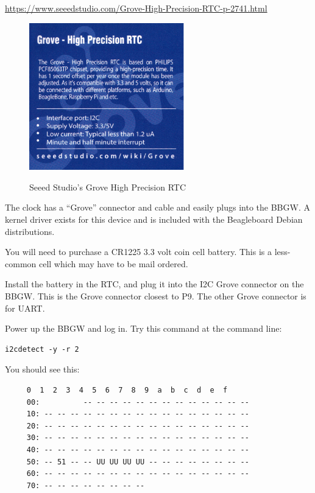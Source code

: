 \url{https://www.seeedstudio.com/Grove-High-Precision-RTC-p-2741.html}

\begin{figure}[H]
	\centering
	\includegraphics[width=0.6\textwidth]{photos/grove-rtc}
	\centering\bfseries
	\caption{Seeed Studio's Grove High Precision RTC}
\end{figure}

The clock has a ``Grove'' connector and cable and easily plugs into the BBGW.  A kernel driver exists for this device and is included with the Beagleboard Debian distributions.

You will need to purchase a CR1225 3.3 volt coin cell battery.  This is a less-common cell which may have to be mail ordered.

Install the battery in the RTC, and plug it into the I2C Grove connector on the BBGW.  This is the Grove connector closest to P9.  The other Grove connector is for UART.

Power up the BBGW and log in.  Try this command at the command line:

\begin{verbatim}
i2cdetect -y -r 2
\end{verbatim}

You should see this:

\begin{verbatim}
     0  1  2  3  4  5  6  7  8  9  a  b  c  d  e  f
     00:          -- -- -- -- -- -- -- -- -- -- -- -- -- 
     10: -- -- -- -- -- -- -- -- -- -- -- -- -- -- -- -- 
     20: -- -- -- -- -- -- -- -- -- -- -- -- -- -- -- -- 
     30: -- -- -- -- -- -- -- -- -- -- -- -- -- -- -- -- 
     40: -- -- -- -- -- -- -- -- -- -- -- -- -- -- -- -- 
     50: -- 51 -- -- UU UU UU UU -- -- -- -- -- -- -- -- 
     60: -- -- -- -- -- -- -- -- -- -- -- -- -- -- -- -- 
     70: -- -- -- -- -- -- -- --
\end{verbatim}

